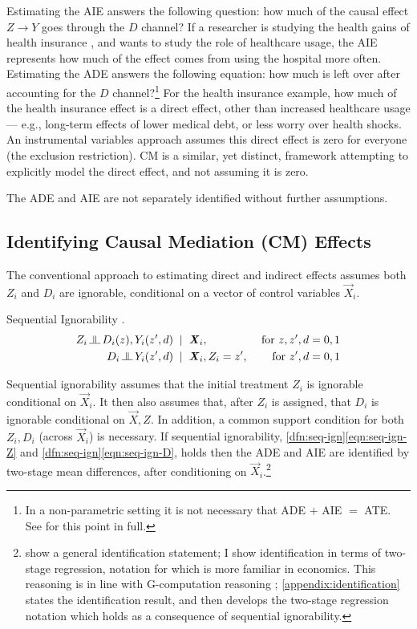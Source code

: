 Estimating the AIE answers the following question: how much of the causal effect $Z \to Y$ goes through the $D$ channel?
If a researcher is studying the health gains of health insurance \citep{finkelstein2008oregon}, and wants to study the role of healthcare usage, the AIE represents how much of the effect comes from using the hospital more often.
Estimating the ADE answers the following equation: how much is left over after accounting for the $D$ channel?\footnote{
    In a non-parametric setting it is not necessary that ADE $+$ AIE $=$ ATE.
    See \cite{imai2010identification} for this point in full.
}
For the health insurance example, how much of the health insurance effect is a direct effect, other than increased healthcare usage --- e.g., long-term effects of lower medical debt, or less worry over health shocks.
An instrumental variables approach assumes this direct effect is zero for everyone (the exclusion restriction).
CM is a similar, yet distinct, framework attempting to explicitly model the direct effect, and not assuming it is zero.

The ADE and AIE are not separately identified without further assumptions.

\subsection{Identifying Causal Mediation (CM) Effects}
The conventional approach to estimating direct and indirect effects assumes both $Z_i$ and $D_i$ are ignorable, conditional on a vector of control variables $\vec X_i$.
\begin{definition}
    \label{dfn:seq-ign}
    Sequential Ignorability \citep{imai2010identification}.
    \begin{align}
        \label{eqn:seq-ign-Z}
        Z_i \indep  D_i(z), Y_i(z', d) \;\; &| \;\; \vec X_i,
            &\textnormal{ for } z, z', d = 0, 1 \\
        \label{eqn:seq-ign-D}
        D_i \indep Y_i(z', d) \;\; &| \;\; \vec X_i, Z_i = z', 
            &\textnormal{ for } z', d = 0, 1
    \end{align}
\end{definition}
Sequential ignorability assumes that the initial treatment $Z_i$ is ignorable conditional on $\vec X_i$.
It then also assumes that, after $Z_i$ is assigned, that $D_i$ is ignorable conditional on $\vec X, Z$.
In addition, a common support condition for both $Z_i, D_i$ (across $\vec X_i$) is necessary.
If sequential ignorability, \ref{dfn:seq-ign}\eqref{eqn:seq-ign-Z} and \ref{dfn:seq-ign}\eqref{eqn:seq-ign-D}, holds then the ADE and AIE are identified by two-stage mean differences, after conditioning on $\vec X_i$.\footnote{
    \cite{imai2010identification} show a general identification statement; I show identification in terms of two-stage regression, notation for which is more familiar in economics.
    This reasoning is in line with G-computation reasoning \citep{robins1986g};
    \autoref{appendix:identification} states the \cite{imai2010identification} identification result, and then develops the two-stage regression notation which holds as a consequence of sequential ignorability.
}
\vspace{0.1cm}

